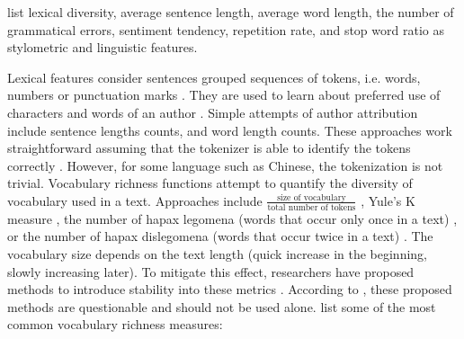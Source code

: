 \citet{bevendorff_overview_2024} list lexical diversity, average sentence length, average word length, 
the number of grammatical errors, sentiment tendency, repetition rate, and stop word ratio as 
stylometric and linguistic features.

Lexical features consider sentences grouped sequences of tokens, i.e. words, numbers or punctuation marks \cite{bevendorff_overview_2024}.
They are used to learn about preferred use of characters and words of an author \cite{elmanarelbouanani_authorship_2014}.
Simple attempts of author attribution include sentence lengths counts, and word length counts.
These approaches work straightforward assuming that the tokenizer is able to identify the tokens correctly \cite{bevendorff_overview_2024,elmanarelbouanani_authorship_2014}.
However, for some language such as Chinese, the tokenization is not trivial.
Vocabulary richness functions attempt to quantify the diversity of vocabulary used in a text.
Approaches include $\frac{\text{size of vocabulary}}{\text{total number of tokens}}$ \cite{elmanarelbouanani_authorship_2014,bevendorff_overview_2024},
Yule's K measure \cite{elmanarelbouanani_authorship_2014},
the number of hapax legomena (words that occur only once in a text) \cite{elmanarelbouanani_authorship_2014,bevendorff_overview_2024,weerasinghe_feature_vector_difference_2021}, 
or the number of hapax dislegomena (words that occur twice in a text) \cite{elmanarelbouanani_authorship_2014,weerasinghe_feature_vector_difference_2021}.
The vocabulary size depends on the text length (quick increase in the beginning, slowly increasing later).
To mitigate this effect, researchers have proposed methods to introduce stability into these metrics \cite{elmanarelbouanani_authorship_2014,bevendorff_overview_2024}. 
According to \citet{stamatatos_survey_2009}, these proposed methods are questionable and should not be used alone.
\citet{neal_surveying_2018} list some of the most common vocabulary richness measures:
